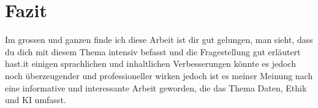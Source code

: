 \documentclass{article}
\begin{document}
\section{Fazit}
Im grossen und ganzen finde ich diese Arbeit ist dir gut gelungen, man sieht, dass du dich mit diesem Thema intensiv befasst und 
die Fragestellung gut erläutert hast.it einigen sprachlichen und inhaltlichen Verbesserungen könnte es jedoch noch überzeugender und professioneller wirken jedoch ist es meiner Meinung nach
eine informative und interessante Arbeit geworden, die das Thema Daten, Ethik und KI umfasst.   

\printbibliography
\end{document}
